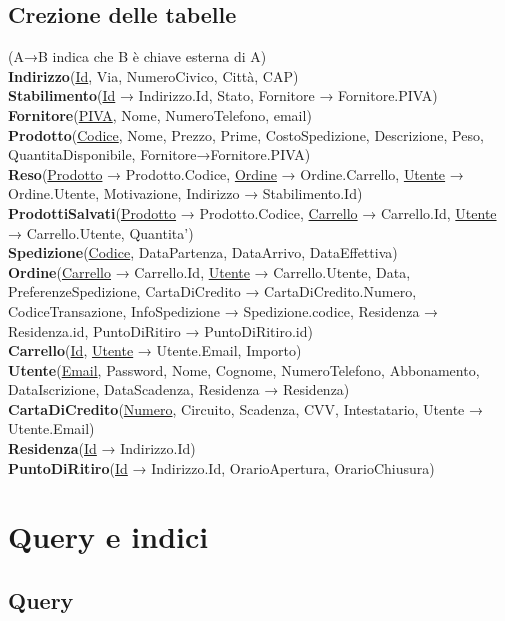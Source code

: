 \documentclass[11pt]{article}
\begin{document}
\subsection{Crezione delle tabelle} 

(A→B indica che B è chiave esterna di A)\\
\textbf{Indirizzo}(\underline{Id}, Via, NumeroCivico, Città, CAP)\\
\textbf{Stabilimento}(\underline{Id} → Indirizzo.Id, Stato, Fornitore → Fornitore.PIVA)\\
\textbf{Fornitore}(\underline{PIVA}, Nome, NumeroTelefono, email)\\
\textbf{Prodotto}(\underline{Codice}, Nome, Prezzo, Prime, CostoSpedizione, Descrizione, Peso, QuantitaDisponibile, Fornitore→Fornitore.PIVA)\\
\textbf{Reso}(\underline{Prodotto} → Prodotto.Codice, \underline{Ordine} → Ordine.Carrello, \underline{Utente} → Ordine.Utente, Motivazione, Indirizzo → Stabilimento.Id)\\
\textbf{ProdottiSalvati}(\underline{Prodotto} → Prodotto.Codice, \underline{Carrello} → Carrello.Id, \underline{Utente} → Carrello.Utente, Quantita')\\
\textbf{Spedizione}(\underline{Codice}, DataPartenza, DataArrivo, DataEffettiva)\\
\textbf{Ordine}(\underline{Carrello} → Carrello.Id, \underline{Utente} → Carrello.Utente, Data, PreferenzeSpedizione, CartaDiCredito → CartaDiCredito.Numero, CodiceTransazione, InfoSpedizione → Spedizione.codice, Residenza → Residenza.id, PuntoDiRitiro → PuntoDiRitiro.id)\\
\textbf{Carrello}(\underline{Id}, \underline{Utente} → Utente.Email, Importo)\\
\textbf{Utente}(\underline{Email}, Password, Nome, Cognome, NumeroTelefono, Abbonamento, DataIscrizione, DataScadenza, Residenza → Residenza)\\
\textbf{CartaDiCredito}(\underline{Numero}, Circuito, Scadenza, CVV, Intestatario, Utente → Utente.Email)\\
\textbf{Residenza}(\underline{Id} → Indirizzo.Id)\\
\textbf{PuntoDiRitiro}(\underline{Id} → Indirizzo.Id, OrarioApertura, OrarioChiusura)

\section{Query e indici}

\subsection{Query}
\end{document}
